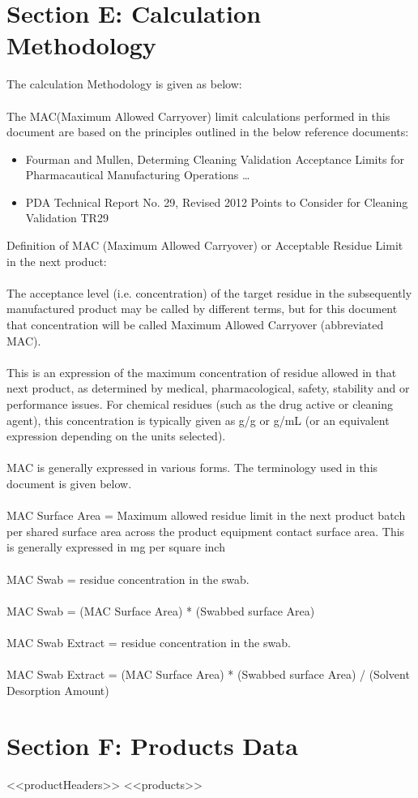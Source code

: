 \documentclass{article}
\begin{document}
        \section{Section E: Calculation Methodology}
        The calculation Methodology is given as below:\\\\
        The MAC(Maximum Allowed Carryover) limit calculations performed in this document are based on the principles outlined in the below reference documents:\\
        \begin{itemize}
        \item Fourman and Mullen, Determing Cleaning Validation Acceptance Limits for Pharmacautical Manufacturing Operations \dots{}
        \item PDA Technical Report No. 29, Revised 2012 Points to Consider for Cleaning Validation TR29
        \end{itemize}
        Definition of MAC (Maximum Allowed Carryover) or Acceptable Residue Limit in the next product:\\\\
        The acceptance level (i.e. concentration) of the target residue in the subsequently manufactured product may be called by different terms, but for this document that concentration will be called Maximum Allowed Carryover (abbreviated MAC).\\\\
        This is an expression of the maximum concentration of residue allowed in that next product, as determined by medical, pharmacological, safety, stability and
        or performance issues. For chemical residues (such as the drug active or cleaning agent), this concentration is typically given
        as {\textmu}g/g or {\textmu}g/mL (or an equivalent expression depending on the units selected).\\\\
        MAC is generally expressed in various forms. The terminology used in this document is given below.\\\\
        MAC Surface Area = Maximum allowed residue limit in the next product batch per shared surface area across the product equipment contact surface area. This is generally expressed in mg per square inch\\\\
        MAC Swab = residue concentration in the swab.\\\\
        MAC Swab = (MAC Surface Area) * (Swabbed surface Area)\\\\
        MAC Swab Extract = residue concentration in the swab.\\\\
        MAC Swab Extract = (MAC Surface Area) * (Swabbed surface Area) / (Solvent Desorption Amount)
        \newpage
        \section{Section F: Products Data}
        \begin{longtable}[l]{<<productHeaders>>}
        <<products>>
        \end{longtable}
        
\end{document}
